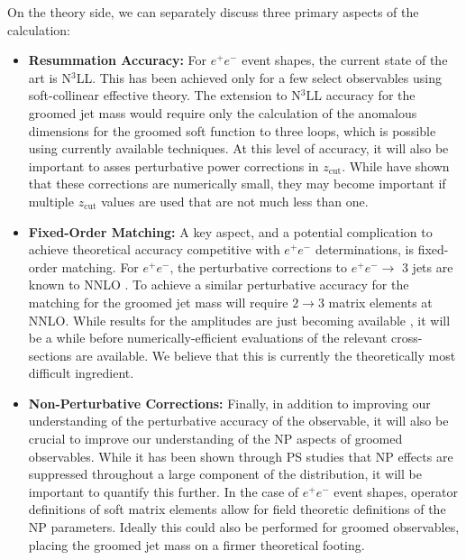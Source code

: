 \documentclass[11pt]{cernrep}
\begin{document}
On the theory side, we can separately discuss three primary aspects of the calculation:
%
\begin{itemize}
\item {\bf Resummation Accuracy:} For $e^+e^-$ event shapes, the current state of the art is N$^3$LL.
%
This has been achieved only for a few select observables using soft-collinear effective theory.
%
The extension to N$^3$LL accuracy for the groomed jet mass would require only the calculation of the anomalous dimensions for the groomed soft function to three loops, which is possible using currently available techniques.
%
At this level of accuracy, it will also be important to asses perturbative power corrections in $z_{\mathrm{cut}}$.
%
While \cite{Marzani:2017kqd,Marzani:2017mva} have shown that these corrections are numerically small, they may become important if multiple $z_{\mathrm{cut}}$ values are used that are not much less than one.
%
\item {\bf Fixed-Order Matching:} A key aspect, and a potential complication to achieve theoretical accuracy competitive with $e^+e^-$ determinations, is fixed-order matching.
%
For $e^+e^-$, the perturbative corrections to $e^+e^- \rightarrow$ 3 jets are known to NNLO \cite{GehrmannDeRidder:2007hr,Gehrmann-DeRidder:2007nzq,Weinzierl:2008iv,Weinzierl:2009ms}.
%
To achieve a similar perturbative accuracy for the matching for the groomed jet mass will require $2\rightarrow 3$ matrix elements at NNLO.
%
While results for the amplitudes are just becoming available \cite{Gehrmann:2015bfy,Dunbar:2016aux,Badger:2013yda,Badger:2017jhb,Abreu:2017hqn}, it will be a while before numerically-efficient evaluations of the relevant cross-sections are available.
%
We believe that this is currently the theoretically most difficult ingredient.
%
\item {\bf Non-Perturbative Corrections:} Finally, in addition to improving our understanding of the perturbative accuracy of the observable, it will also be crucial to improve our understanding of the NP aspects of groomed observables.
%
While it has been shown through PS studies that NP effects are suppressed throughout a large component of the distribution, it will be important to quantify this further.
%
In the case of $e^+e^-$ event shapes, operator definitions of soft matrix elements allow for field theoretic definitions of the NP parameters.
%
Ideally this could also be performed for groomed observables, placing the groomed jet mass on a firmer theoretical footing.
%
\end{itemize}
\end{document}
